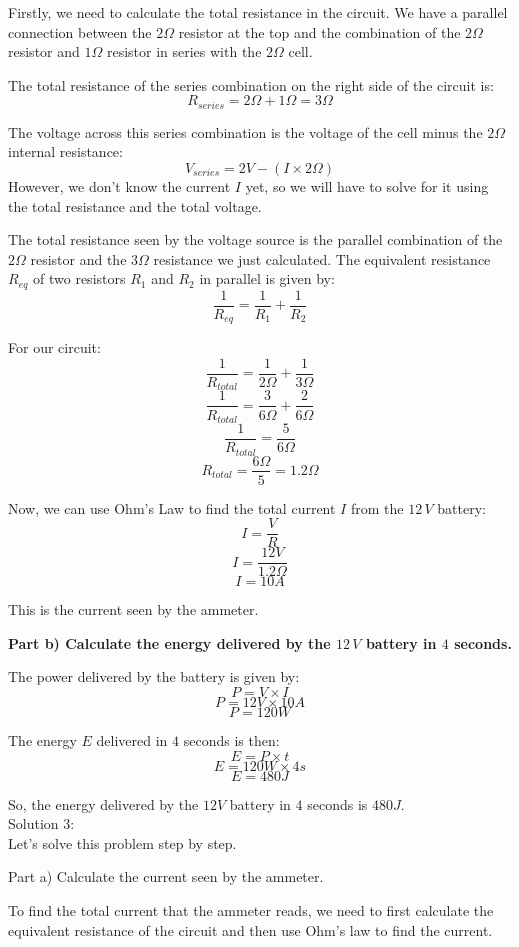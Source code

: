 \documentclass[a4paper,11pt]{article}
\begin{document}
Firstly, we need to calculate the total resistance in the circuit. We have a parallel connection between the \(2\Omega\) resistor at the top and the combination of the \(2\Omega\) resistor and \(1\Omega\) resistor in series with the \(2\Omega\) cell.

The total resistance of the series combination on the right side of the circuit is:
\[ R_{series} = 2\Omega + 1\Omega = 3\Omega \]

The voltage across this series combination is the voltage of the cell minus the \(2\Omega\) internal resistance:
\[ V_{series} = 2V - (I \times 2\Omega) \]
However, we don't know the current \(I\) yet, so we will have to solve for it using the total resistance and the total voltage.

The total resistance seen by the voltage source is the parallel combination of the \(2\Omega\) resistor and the \(3\Omega\) resistance we just calculated. The equivalent resistance \( R_{eq} \) of two resistors \( R_1 \) and \( R_2 \) in parallel is given by:
\[ \frac{1}{R_{eq}} = \frac{1}{R_1} + \frac{1}{R_2} \]

For our circuit:
\[ \frac{1}{R_{total}} = \frac{1}{2\Omega} + \frac{1}{3\Omega} \]
\[ \frac{1}{R_{total}} = \frac{3}{6\Omega} + \frac{2}{6\Omega} \]
\[ \frac{1}{R_{total}} = \frac{5}{6\Omega} \]
\[ R_{total} = \frac{6\Omega}{5} = 1.2\Omega \]

Now, we can use Ohm's Law to find the total current \( I \) from the \(12\,V\) battery:
\[ I = \frac{V}{R} \]
\[ I = \frac{12V}{1.2\Omega} \]
\[ I = 10A \]

This is the current seen by the ammeter.

\textbf{Part b) Calculate the energy delivered by the \(12\,V\) battery in \(4\) seconds.}

The power delivered by the battery is given by:
\[ P = V \times I \]
\[ P = 12V \times 10A \]
\[ P = 120W \]

The energy \( E \) delivered in \( 4 \) seconds is then:
\[ E = P \times t \]
\[ E = 120W \times 4s \]
\[ E = 480J \]

So, the energy delivered by the \(12V\) battery in \(4\) seconds is \(480J\). \\

\noindent Solution 3: \\ 

Let's solve this problem step by step.

Part a) Calculate the current seen by the ammeter.

To find the total current that the ammeter reads, we need to first calculate the equivalent resistance of the circuit and then use Ohm's law to find the current.
\end{document}
